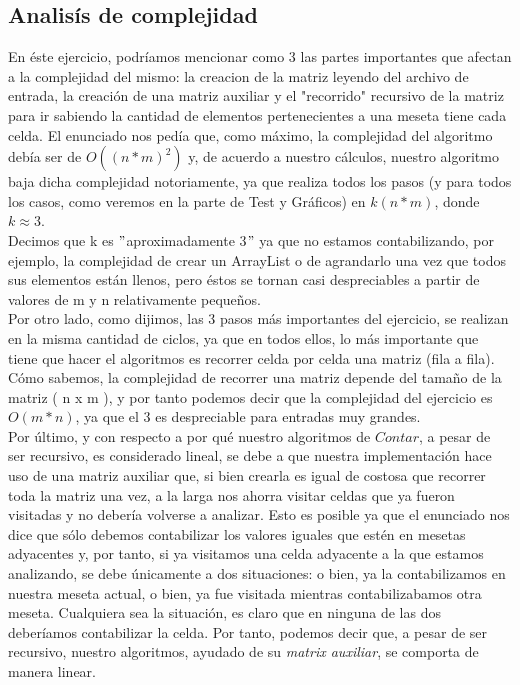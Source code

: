 \subsection{Analisís de complejidad}	
En éste ejercicio, podríamos mencionar como 3 las partes importantes que afectan a la complejidad del mismo: la creacion de la matriz leyendo del archivo de entrada, la creación de una matriz auxiliar y el "recorrido" recursivo de la matriz para ir sabiendo la cantidad de elementos pertenecientes a una meseta tiene cada celda.
El enunciado nos pedía que, como máximo, la complejidad del algoritmo debía ser de $O((n * m)^2)$ y, de acuerdo a nuestro cálculos, nuestro algoritmo baja dicha complejidad notoriamente, ya que realiza todos los pasos (y para todos los casos, como veremos en la parte de Test y Gráficos) en $k(n * m)$, donde $k \approx 3$. \\
Decimos que k es $"$aproximadamente 3$"$ ya que no estamos contabilizando, por ejemplo, la complejidad de crear un ArrayList o de agrandarlo una vez que todos sus elementos están llenos, pero éstos se tornan casi despreciables a partir de valores de m y n relativamente pequeños. \\
Por otro lado, como dijimos, las 3 pasos más importantes del ejercicio, se realizan en la misma cantidad de ciclos, ya que en todos ellos, lo más importante que tiene que hacer el algoritmos es recorrer celda por celda una matriz (fila a fila). Cómo sabemos, la complejidad de recorrer una matriz depende del tamaño de la matriz ( n x m ), y por tanto podemos decir que la complejidad del ejercicio es $O(m*n)$, ya que el 3 es despreciable para entradas muy grandes. \\
Por último, y con respecto a por qué nuestro algoritmos de $Contar$, a pesar de ser recursivo, es considerado lineal, se debe a que nuestra implementación hace uso de una matriz auxiliar que, si bien crearla es igual de costosa que recorrer toda la matriz una vez, a la larga nos ahorra visitar celdas que ya fueron visitadas y no debería volverse a analizar. Esto es posible ya que el enunciado nos dice que sólo debemos contabilizar los valores iguales que estén en mesetas adyacentes y, por tanto, si ya visitamos una celda adyacente a la que estamos analizando, se debe únicamente a dos situaciones: o bien, ya la contabilizamos en nuestra meseta actual, o bien, ya fue visitada mientras contabilizabamos otra meseta. Cualquiera sea la situación, es claro que en ninguna de las dos deberíamos contabilizar la celda. Por tanto, podemos decir que, a pesar de ser recursivo, nuestro algoritmos, ayudado de su \textit{matrix auxiliar}, se comporta de manera linear. \\


